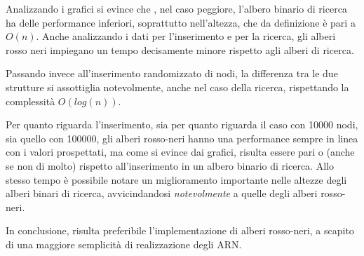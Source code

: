 \documentclass[
]{article}
\begin{document}
Analizzando i grafici si evince che , nel caso peggiore, l’albero binario 
di ricerca ha delle performance inferiori, soprattutto nell’altezza, che da
definizione è pari a \({O}(n)\). Anche analizzando i dati per l’inserimento 
e per la ricerca, gli alberi rosso neri impiegano un tempo decisamente minore 
rispetto agli alberi di ricerca.

Passando invece all'inserimento randomizzato di nodi, la differenza tra le due
strutture si assottiglia notevolmente, anche nel caso della ricerca,
rispettando la complessità \({O}(log(n))\). 

Per quanto riguarda l'inserimento, sia per quanto riguarda il caso con 10000 nodi, sia
quello con 100000, gli alberi rosso-neri hanno una performance sempre in
linea con i valori prospettati, ma come si evince dai grafici, risulta essere pari
o (anche se non di molto) rispetto all'inserimento in un albero binario di ricerca.
Allo stesso tempo è possibile notare un miglioramento importante nelle altezze degli alberi binari
di ricerca, avvicindandosi \emph{notevolmente} a quelle degli alberi
rosso-neri.

In conclusione, risulta preferibile l'implementazione di alberi
rosso-neri, a scapito di una maggiore semplicità di realizzazione degli
ARN.
\end{document}
